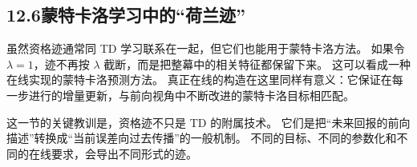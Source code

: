 \documentclass[UTF8, 12pt, fontset=fandol, oneside]{ctexart}
\begin{document}
\begin{center}
\end{center}

\subsection*{12.6\quad 蒙特卡洛学习中的“荷兰迹”}

虽然资格迹通常同 TD 学习联系在一起，但它们也能用于蒙特卡洛方法。
如果令 $\lambda=1$，迹不再按 $\lambda$ 截断，而是把整幕中的相关特征都保留下来。
这可以看成一种在线实现的蒙特卡洛预测方法。
真正在线的构造在这里同样有意义：它保证在每一步进行的增量更新，与前向视角中不断改进的蒙特卡洛目标相匹配。

这一节的关键教训是，资格迹不只是 TD 的附属技术。
它们是把“未来回报的前向描述”转换成“当前误差向过去传播”的一般机制。
不同的目标、不同的参数化和不同的在线要求，会导出不同形式的迹。
\end{document}
